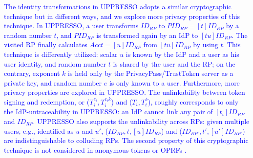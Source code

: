 
\textcolor{blue}{The identity transformations in UPPRESSO adopts a similar cryptographic technique but in different ways,
    and we explore more privacy properties of this technique.
In UPPRESSO, a user transforms $ID_{RP}$ to $PID_{RP} = [t]ID_{RP}$ by a random number $t$,
 and $PID_{RP}$ is transformed again by an IdP to $[tu]ID_{RP}$.
The visited RP finally calculates $Acct = [u]ID_{RP}$ from $[tu]ID_{RP}$ by using $t$.
This technique is differently utilized:
scalar $u$ is known by the IdP and a user as his user identity, and
random number $t$ is shared by the user and the RP;
 on the contrary,
exponent $k$ is held only by the PrivacyPass/TrustToken server as a private key,
 and random number $e$ is only known to a user.
Furthermore, more privacy properties are explored in UPPRESSO.
The unlinkability between token signing and redemption, or
($T_i^{e_i}, T_i^{e_ik}$) and  ($T_i, T_i^k$),
roughly corresponds to only the IdP-untraceability in UPPRESSO:
 an IdP cannot link any pair of $[t_i]ID_{RP}$ and $ID_{RP}$.
UPPRESSO also supports the unlinkability across RPs:
given multiple users, e.g., identified as $u$ and $u'$,
    ($ID_{RP}, t, [u]ID_{RP}$) and ($ID_{RP'}, t', [u']ID_{RP'}$) are indistinguishable to
    colluding RPs.
The second property of this cryptographic technique is not considered
     in anonymous tokens \cite{privacypass,trusttoken} or OPRFs \cite{oprf-proved,voprf-proved}.}

